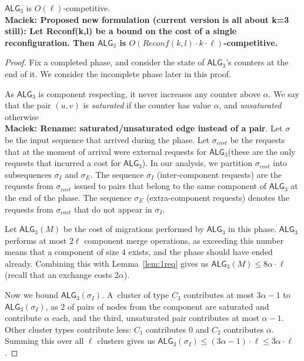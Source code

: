 \documentclass[manuscript,screen=true, review, anonymous]{acmart}
\newcommand{\TAlg}{{\ensuremath{\textsf{ALG}_{3}}}\xspace}
\newcommand\maciek[1]{\color{brown}\textbf{\\ Maciek: #1}\color{black}}
\begin{document}
\begin{theorem}
	\TAlg is $O(\ell)$-competitive.
	\maciek{Proposed new formulation (current version is all about k=3 still): Let Reconf(k,l) be a bound on the cost of a single reconfiguration. Then \TAlg is $O(Reconf(k,l)\cdot k \cdot \ell)$-competitive.}
\end{theorem}
\begin{proof}
	Fix a completed phase, and consider the state of \TAlg's counters at the end of it.
	We consider the incomplete phase later in this proof.
	
	As \TAlg is component respecting, it never increases any counter above $\alpha$.
	We say that the pair $(u, v)$ is \emph{saturated} if the counter has value $\alpha$, and \emph{unsaturated} otherwise \maciek{Rename: saturated/unsaturated edge instead of a pair}.
	Let $\sigma$ be the input sequence that arrived during the phase.
	Let $\sigma_{cost}$ be the requests that at the moment of arrival were external requests for \TAlg (these are the only requests that incurred a cost for \TAlg).
	In our analysis, we partition $\sigma_{cost}$ into subsequences $\sigma_I$ and $\sigma_E$.
	The sequence $\sigma_I$ (inter-component requests) are the requests from $\sigma_{cost}$ issued to pairs that belong to the same component of \TAlg at the end of the phase.
	The sequence $\sigma_E$ (extra-component requests) denotes the requests from $\sigma_{cost}$ that do not appear in $\sigma_I$.
	
	
	Let $\TAlg(M)$ be the cost of migrations performed by \TAlg in this phase.
	\TAlg performs at most $2 \ell$ component merge operations, as
	exceeding this number means that a component of size $4$ exists, and the phase should have ended already.
	Combining this with Lemma~\ref{lem:1req} gives us $\TAlg(M) \leq 8\alpha\cdot\ell$ (recall that an exchange costs $2\alpha$).
	
	Now we bound $\TAlg(\sigma_I)$.
	A~cluster of type $C_3$ contributes at most $3 \alpha - 1$ to $\TAlg(\sigma_I)$, as $2$ of pairs of nodes from the component are saturated and contribute $\alpha$ each, and the third, unsaturated pair contributes at most $\alpha-1$.
	Other cluster types contribute less: $C_1$ contributes $0$ and $C_2$ contributes $\alpha$.
	Summing this over all $\ell$ clusters gives us $\TAlg(\sigma_I) \leq (3 \alpha-1)\cdot \ell \leq 3\alpha\cdot\ell$.
	

\end{proof}
\end{document}
